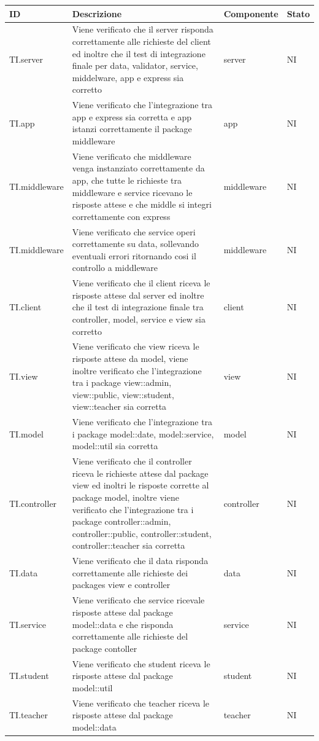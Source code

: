 \documentclass[12pt,a4paper]{article}
\begin{document}
	\begin{longtable}{l p{8cm} l l}
		\midrule
		\textbf{ID} & \textbf{Descrizione} & \textbf{Componente} & \textbf{Stato} \tabularnewline
		\midrule
		\midrule
		TI.server & Viene verificato che il server risponda correttamente alle richieste del client ed inoltre che il test di integrazione finale per data, validator, service, middelware, app e express sia corretto & server & NI\tabularnewline
		\midrule
		TI.app & Viene verificato che  l'integrazione tra app e express sia corretta e app istanzi correttamente il package middleware & app & NI\tabularnewline
		\midrule
		TI.middleware & Viene verificato che middleware venga instanziato correttamente da app, che tutte le richieste tra middleware e service ricevano le risposte attese e che middle si integri correttamente con express  & middleware & NI\tabularnewline
		\midrule
		TI.middleware & Viene verificato che service operi correttamente su data, sollevando eventuali errori ritornando cosi il controllo a middleware & middleware & NI\tabularnewline
		\midrule
		TI.client & Viene verificato che il client riceva le risposte attese dal server ed inoltre che il test di integrazione finale tra controller, model, service e view sia corretto & client & NI\tabularnewline
		\midrule
		TI.view & Viene verificato che view riceva le risposte attese da model, viene inoltre verificato che l'integrazione tra i package view::admin, view::public, view::student, view::teacher sia corretta & view & NI\tabularnewline
		\midrule
		TI.model & Viene verificato che l'integrazione tra i package model::date, model::service, model::util sia corretta & model & NI\tabularnewline
		\midrule
		TI.controller & Viene verificato che il controller riceva le richieste attese dal package view ed inoltri le risposte corrette al package model, inoltre viene verificato che l'integrazione tra i package controller::admin, controller::public, controller::student, controller::teacher sia corretta & controller & NI\tabularnewline
		\midrule
		TI.data & Viene verificato che il data risponda correttamente alle richieste dei packages view e controller & data & NI\tabularnewline
		\midrule
		TI.service & Viene verificato che service ricevale risposte attese dal package model::data e che risponda correttamente alle richieste del package contoller & service & NI\tabularnewline
		\midrule
		TI.student & Viene verificato che student riceva le risposte attese dal package model::util & student & NI\tabularnewline
		\midrule
		TI.teacher & Viene verificato che teacher riceva le risposte attese dal package model::data & teacher & NI\tabularnewline

\end{longtable}
\end{document}
